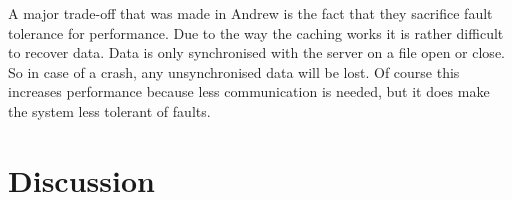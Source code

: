 \documentclass[a4paper,12px]{article}
\begin{document}
A major trade-off that was made in Andrew is the fact that they sacrifice fault
tolerance for performance. Due to the way the caching works it is rather
difficult to recover data. Data is only synchronised with the server on a file
open or close.\cite{andrew} So in case of a crash, any unsynchronised data will
be lost.  Of course this increases performance because less communication is
needed, but it does make the system less tolerant of faults.






\section{Discussion}




\clearpage


\end{document}
